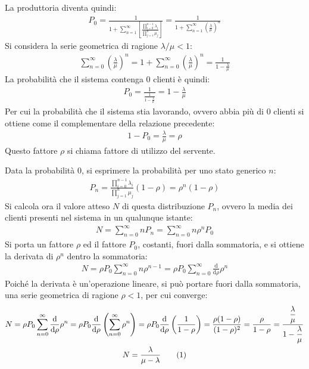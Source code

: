 \documentclass{article}
\newcommand{\df}{\mathrm{d}}
\newcommand{\tageq}{\tag{\stepcounter{equation}\theequation}}
\numberwithin{equation}{subsection}
\begin{document}
La produttoria diventa quindi:
\begin{gather*}
    P_0=\displaystyle\frac{1}{1+\displaystyle\sum_{n=1}^{\infty}\left[\frac{\displaystyle\prod_{i=0}^{n-1}\lambda_i}{\displaystyle\prod_{j=1}^n\mu_j}\right]}=\frac{1}{1+\displaystyle\sum_{n=1}^{\infty}\left(\frac{\lambda}{\mu}\right)^n}
\end{gather*}
Si considera la serie geometrica di ragione $\lambda/\mu<1$:
\begin{gather*}
    \displaystyle\sum_{n=0}^{\infty}\left(\frac{\lambda}{\mu}\right)^n=1+\sum_{n=0}^{\infty}\left(\frac{\lambda}{\mu}\right)^n=\frac{1}{1-\displaystyle\frac{\lambda}{\mu}}
\end{gather*}
La probabilità che il sistema contenga $0$ clienti è quindi:
\begin{gather*}
    P_0=\displaystyle\frac{1}{\displaystyle\frac{1}{1-\displaystyle\frac{\lambda}{\mu}}}=1-\frac{\lambda}{\mu}
\end{gather*}
Per cui la probabilità che il sistema stia lavorando, ovvero abbia più di $0$ clienti si ottiene come il complementare della relazione precedente:
\begin{gather*}
    1-P_0=\displaystyle\frac{\lambda}{\mu}=\rho
\end{gather*}
Questo fattore $\rho$ si chiama fattore di utilizzo del servente. 

Data la probabilità $0$, si esprimere la probabilità per uno stato generico $n$:
\begin{gather*}
    P_n=\displaystyle\frac{\displaystyle\prod_{i=0}^{n-1}\lambda_i}{\displaystyle\prod_{j=1}^n\mu_j}\left(1-\rho\right)=\rho^n\left(1-\rho\right)
\end{gather*}
Si calcola ora il valore atteso $N$ di questa distribuzione $P_n$, ovvero la media dei clienti presenti nel sistema in un qualunque istante:
\begin{gather*}
    N=\displaystyle\sum_{n=0}^{\infty}nP_n=\sum_{n=0}^{\infty}n\rho^nP_0
\end{gather*}
Si porta un fattore $\rho$ ed il fattore $P_0$, costanti, fuori dalla sommatoria, e si ottiene la derivata di $\rho^n$ dentro la sommatoria:
\begin{gather*}
    N=\rho P_0\displaystyle\sum_{n=0}^{\infty}n\rho^{n-1}=\rho P_0\displaystyle\sum_{n=0}^{\infty}\frac{\df}{\df\rho}\rho^n
\end{gather*}
Poiché la derivata è un'operazione lineare, si può portare fuori dalla sommatoria, una serie geometrica di ragione $\rho<1$, per cui converge:
\begin{gather*}
    N=\rho P_0\displaystyle\sum_{n=0}^{\infty}\frac{\df}{\df\rho}\rho^n=\rho P_0\frac{\df}{\df\rho}\left(\sum_{n=0}^{\infty}\rho^n\right)=\rho P_0\frac{\df}{\df\rho}\left(\frac{1}{1-\rho}\right)=\frac{\rho(1-\rho)}{(1-\rho)^2}=\frac{\rho}{1-\rho}=\frac{\displaystyle\frac{\lambda}{\mu}}{1-\displaystyle\frac{\lambda}{\mu}}\\
    N=\displaystyle\frac{\lambda}{\mu-\lambda}\tageq
\end{gather*}
\end{document}
